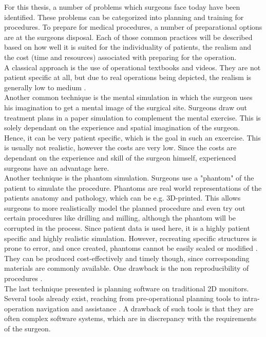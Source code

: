 For this thesis, a number of problems which surgeons face today have been identified.
These problems can be categorized into planning and training for procedures.
To prepare for medical procedures, a number of preparational options are at the surgeons disposal.
Each of those common practices will be described based on how well it is suited for the individuality of patients, the realism and the cost (time and resources) 
associated with preparing for the operation.
\\ A classical approach is the use of operational textbooks and videos.
They are not patient specific at all, but due to real operations being depicted, the realism is generally low to medium \cite{Ellis.2005}.
\\ Another common technique is the mental simulation in which the surgeon uses his imagination to get a mental image of the surgical site.
Surgeons draw out treatment plans in a paper simulation to complement the mental exercise.
This is solely dependant on the experience and spatial imagination of the surgeon. 
Hence, it can be very patient specific, which is the goal in such an excercise.
This is usually not realistic, however the costs are very low.
Since the costs are dependant on the experience and skill of the surgeon himself, experienced surgeons have an advantage here.
\\ Another technique is the phantom simulation.
Surgeons use a "phantom" of the patient to simulate the procedure.
Phantoms are real world representations of the patients anatomy and pathology, which can be e.g. 3D-printed.
This allows surgeons to more realistically model the planned procedure and even try out certain procedures like drilling and milling, although the phantom will be corrupted in the process.
Since patient data is used here, it is a highly patient specific and highly realistic simulation.
However, recreating specific structures is prone to error, and once created, phantoms cannot be easily scaled or modified \cite{TejoOtero.2020}.
They can be produced cost-effectively and timely though, since corresponding materials are commonly available.
One drawback is the non reproducibility of procedures \cite{richardson2015cost}.
\\ The last technique presented is planning software on traditional 2D monitors.
Several tools already exist, reaching from pre-operational planning tools to intra-operation navigation and assistance \cite{HASSFELD20012}.
A drawback of such tools is that they are often complex software systems, which are in discrepancy with the requirements of the surgeon.

